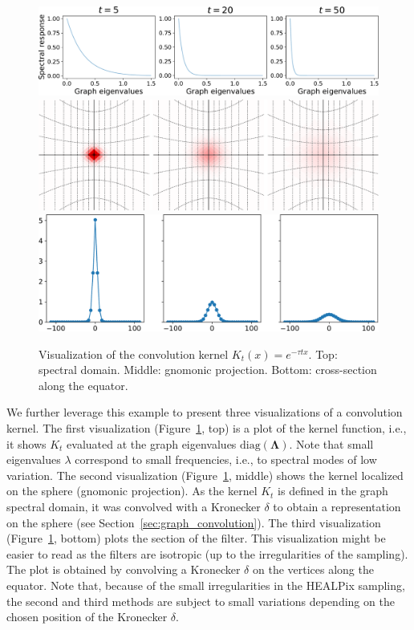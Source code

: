 \documentclass[final,twocolumn,3p,times,sort&compress]{elsarticle}
\newcommand{\figref}[1]{Figure~\ref{fig:#1}}
\newcommand{\secref}[1]{Section~\ref{sec:#1}}
\renewcommand{\b}[1]{{\bm{#1}}}   %
\newcommand{\1}{\b{1}}              %
\newcommand{\0}{\b{0}}              %
\newcommand{\bLambda}{\b{\Lambda}}
\begin{document}
\begin{figure}[t]
	\centering
	\includegraphics[width=\linewidth]{gaussian_filters_spectral} \\
	\vspace{0.2in}
	\includegraphics[width=\linewidth]{gaussian_filters_gnomonic} \\
	\vspace{0.2in}
	\includegraphics[width=\linewidth]{gaussian_filters_section}
	\caption{Visualization of the convolution kernel $K_t(x)=e^{-\tau t x}$. Top: spectral domain. Middle: gnomonic projection. Bottom: cross-section along the equator.}
	\label{fig:gaussian_filters_visualization}
\end{figure}

We further leverage this example to present three visualizations of a convolution kernel.
The first visualization (\figref{gaussian_filters_visualization}, top) is a plot of the kernel function, i.e., it shows $K_t$ evaluated at the graph eigenvalues $\text{diag}(\bLambda)$.
Note that small eigenvalues $\lambda$ correspond to small frequencies, i.e., to spectral modes of low variation.
The second visualization (\figref{gaussian_filters_visualization}, middle) shows the kernel localized on the sphere (gnomonic projection).
As the kernel $K_t$ is defined in the graph spectral domain, it was convolved with a Kronecker $\delta$ to obtain a representation on the sphere (see \secref{graph_convolution}).
The third visualization (\figref{gaussian_filters_visualization}, bottom) plots the section of the filter.
This visualization might be easier to read as the filters are isotropic (up to the irregularities of the sampling).
The plot is obtained by convolving a Kronecker $\delta$ on the vertices along the equator.
Note that, because of the small irregularities in the HEALPix sampling, the second and third methods are subject to small variations depending on the chosen position of the Kronecker $\delta$.
\end{document}
